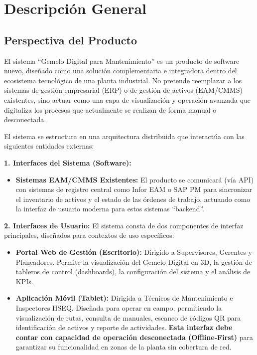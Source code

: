 \section{Descripción General}

\subsection{Perspectiva del Producto}
El sistema ``Gemelo Digital para Mantenimiento'' es un producto de software nuevo, diseñado como una solución complementaria e integradora dentro del ecosistema tecnológico de una planta industrial. No pretende reemplazar a los sistemas de gestión empresarial (ERP) o de gestión de activos (EAM/CMMS) existentes, sino actuar como una capa de visualización y operación avanzada que digitaliza los procesos que actualmente se realizan de forma manual o desconectada.

El sistema se estructura en una arquitectura distribuida que interactúa con las siguientes entidades externas:

\textbf{1. Interfaces del Sistema (Software):}
\begin{itemize}
    \item \textbf{Sistemas EAM/CMMS Existentes:} El producto se comunicará (vía API) con sistemas de registro central como Infor EAM o SAP PM para sincronizar el inventario de activos y el estado de las órdenes de trabajo, actuando como la interfaz de usuario moderna para estos sistemas ``backend''.
\end{itemize}

\textbf{2. Interfaces de Usuario:}
El sistema consta de dos componentes de interfaz principales, diseñados para contextos de uso específicos:
\begin{itemize}
    \item \textbf{Portal Web de Gestión (Escritorio):} Dirigido a Supervisores, Gerentes y Planeadores. Permite la visualización del Gemelo Digital en 3D, la gestión de tableros de control (dashboards), la configuración del sistema y el análisis de KPIs.
    \item \textbf{Aplicación Móvil (Tablet):} Dirigida a Técnicos de Mantenimiento e Inspectores HSEQ. Diseñada para operar en campo, permitiendo la visualización de rutas, consulta de manuales, escaneo de códigos QR para identificación de activos y reporte de actividades. \textbf{Esta interfaz debe contar con capacidad de operación desconectada (Offline-First)} para garantizar su funcionalidad en zonas de la planta sin cobertura de red.
\end{itemize}

